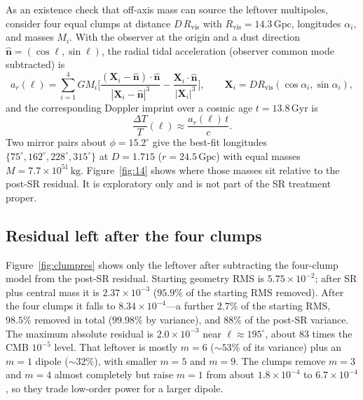 \documentclass[11pt,a4paper]{article}
\begin{document}
As an existence check that off-axis mass can source the leftover multipoles, consider four equal clumps at distance \(D\,R_{\mathrm{vis}}\) with \(R_{\mathrm{vis}}=14.3\,\mathrm{Gpc}\), longitudes \(\alpha_{i}\), and masses \(M_{i}\). With the observer at the origin and a dust direction \(\hat{\mathbf{n}}=(\cos\ell,\sin\ell)\), the radial tidal acceleration (observer common mode subtracted) is
\begin{equation}
\label{eq:ar}
a_{r}(\ell)
=
\sum_{i=1}^{4}GM_{i}
\Biggl[
\frac{(\mathbf{X}_{i}-\hat{\mathbf{n}})\cdot\hat{\mathbf{n}}}{|\mathbf{X}_{i}-\hat{\mathbf{n}}|^{3}}
-
\frac{\mathbf{X}_{i}\cdot\hat{\mathbf{n}}}{|\mathbf{X}_{i}|^{3}}
\Biggr],
\qquad
\mathbf{X}_{i}=D R_{\mathrm{vis}}(\cos\alpha_{i},\sin\alpha_{i}),
\end{equation}
and the corresponding Doppler imprint over a cosmic age \(t=13.8\,\mathrm{Gyr}\) is
\begin{equation}
\label{eq:dTT}
\frac{\Delta T}{T}(\ell)\approx\frac{a_{r}(\ell)\,t}{c}.
\end{equation}
Two mirror pairs about \(\phi=15.2^{\circ}\) give the best-fit longitudes \(\{75^{\circ},162^{\circ},228^{\circ},315^{\circ}\}\) at \(D=1.715\) (\(r=24.5\,\mathrm{Gpc}\)) with equal masses \(M=7.7\times10^{51}\,\mathrm{kg}\). Figure~\ref{fig:14} shows where those masses sit relative to the post-SR residual. It is exploratory only and is not part of the SR treatment proper.



\subsection{Residual left after the four clumps}

Figure~\ref{fig:clumpres} shows only the leftover after subtracting the four-clump model from the post-SR residual. Starting geometry RMS is \(5.75\times10^{-2}\); after SR plus central mass it is \(2.37\times10^{-3}\) (\(95.9\%\) of the starting RMS removed). After the four clumps it falls to \(8.34\times10^{-4}\)---a further \(2.7\%\) of the starting RMS, \(98.5\%\) removed in total (\(99.98\%\) by variance), and \(88\%\) of the post-SR variance. The maximum absolute residual is \(2.0\times10^{-3}\) near \(\ell\approx195^{\circ}\), about \(83\) times the CMB \(10^{-5}\) level. That leftover is mostly \(m=6\) (\(\sim53\%\) of its variance) plus an \(m=1\) dipole (\(\sim32\%\)), with smaller \(m=5\) and \(m=9\). The clumps remove \(m=3\) and \(m=4\) almost completely but raise \(m=1\) from about \(1.8\times10^{-4}\) to \(6.7\times10^{-4}\), so they trade low-order power for a larger dipole.
\end{document}
